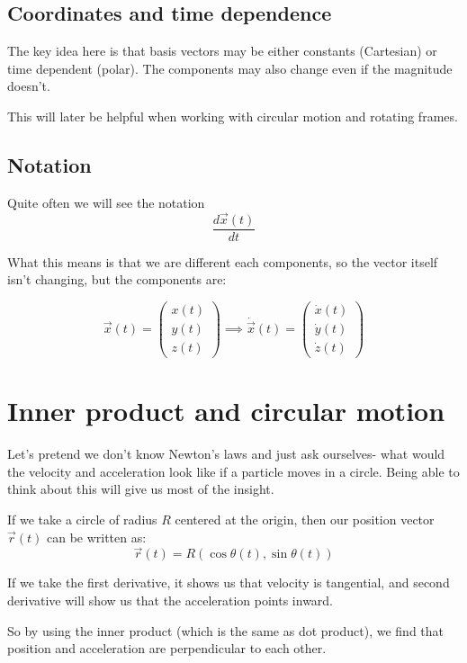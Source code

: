 \subsection{Coordinates and time dependence}

The key idea here is that basis vectors may be either constants (Cartesian) or time dependent (polar). The components may also change even if the magnitude doesn't. 

This will later be helpful when working with circular motion and rotating frames. 

\subsection{Notation}

Quite often we will see the notation 
$$
\frac{d\vec{x} (t)}{dt}
$$

What this means is that we are different each components, so the vector itself isn't changing, but the components are: 

$$
\vec{x} (t) = \begin{pmatrix}
    x(t) \\
    y(t) \\
    z(t) 
\end{pmatrix}
\implies \dot{\vec{x}}(t) = \begin{pmatrix}
    \dot{x}(t) \\
    \dot{y}(t) \\
    \dot{z}(t) 
\end{pmatrix}
$$

\section{Inner product and circular motion} 

Let's pretend we don't know Newton's laws and just ask ourselves- what would the velocity and acceleration look like if a particle moves in a circle. Being able to think about this will give us most of the insight. 

If we take a circle of radius $R$ centered at the origin, then our position vector $\vec{r}(t)$ can be written as: 
$$
\vec{r}(t) = R(\cos \theta (t), \sin \theta (t)) 
$$

If we take the first derivative, it shows us that velocity is tangential, and second derivative will show us that the acceleration points inward. 

So by using the inner product (which is the same as dot product), we find that position and acceleration are perpendicular to each other. 

